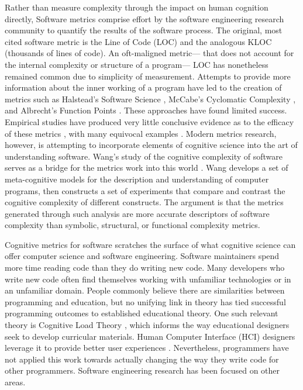 Rather than measure complexity through the impact on human cognition directly, Software metrics comprise effort by the software engineering research community to quantify the results of the software process. The original, most cited software metric is the Line of Code (LOC) and the analogous KLOC (thousands of lines of code). An oft-maligned metric— that does not account for the internal complexity or structure of a program— LOC has nonetheless remained common due to simplicity of measurement. Attempts to provide more information about the inner working of a program have led to the creation of metrics such as Halstead’s Software Science \cite{Halstead1977}, McCabe’s Cyclomatic Complexity \cite{McCabe1976}, and Albrecht’s Function Points \cite{Albrecht1983}. These approaches have found limited success. Empirical studies have produced very little conclusive evidence as to the efficacy of these metrics \cite{Curtis1980}, with many equivocal examples \cite{Curtis1984}. Modern metrics research, however, is attempting to incorporate elements of cognitive science into the art of understanding software.  Wang’s study of the cognitive complexity of software serves as a bridge for the metrics work into this world \cite{Wang2009} \cite{Shao2003}. Wang develops a set of meta-cognitive models for the description and understanding of computer programs, then constructs a set of experiments that compare and contrast the cognitive complexity of different constructs. The argument is that the metrics generated through such analysis are more accurate descriptors of software complexity than symbolic, structural, or functional complexity metrics. 


Cognitive metrics for software scratches the surface of what cognitive science can offer computer science and software engineering. Software maintainers spend more time reading code than they do writing new code. Many developers who write new code often find themselves working with unfamiliar technologies or in an unfamiliar domain. People commonly believe there are similarities between programming and education, but no unifying link in theory has tied successful programming outcomes to established educational theory.  One such relevant theory is Cognitive Load Theory \cite{Clark2006}, which informs the way educational designers seek to develop curricular materials. Human Computer Interface (HCI) designers leverage it to provide better user experiences \cite{Hollender2010,Oviatt2006}. Nevertheless, programmers have not applied this work towards actually changing the way they write code for other programmers. Software engineering research has been focused on other areas.


